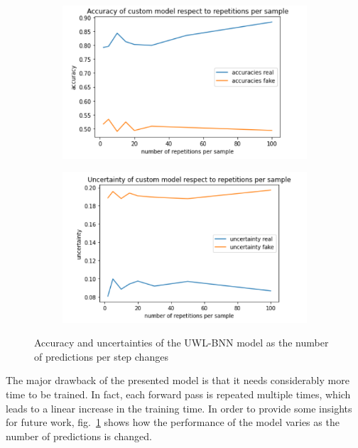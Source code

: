 \documentclass[11pt,twoside,a4paper]{article}
\begin{document}
\begin{figure}[!t]
    \centering
    \begin{subfigure}{0.49\textwidth}
	\includegraphics[width=\linewidth]{Accuracy-Repetitions.png}
        \caption{}
    \end{subfigure}
    \begin{subfigure}{0.49\textwidth}
	\includegraphics[width=\linewidth]{Uncertainties-Repetitions.png}
        \caption{}
    \end{subfigure}
    \caption{Accuracy and uncertainties of the UWL-BNN model as the number of predictions per step changes}
    \label{fig:n_predictions}
\end{figure}

The major drawback of the presented model is that it needs considerably more time to be trained. In fact, each forward pass is repeated multiple times, which leads to a linear increase in the training time. In order to provide some insights for future work, fig.~\ref{fig:n_predictions} shows how the performance of the model varies as the number of predictions is changed.
\end{document}
